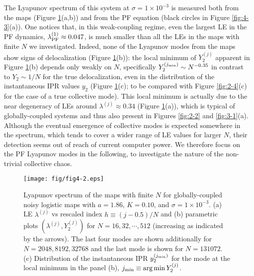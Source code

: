 \documentclass[12pt]{iopart}
\begin{document}
The Lyapunov spectrum of this system at $\sigma = 1 \times 10^{-3}$
 is measured both from the maps (Figure \ref{fig:4-2}(a,b))
 and from the PF equation (black circles in Figure \ref{fig:4-3}(a)).
One notices that, in this weak-coupling regime,
 even the largest LE in the PF dynamics,
 $\lambda_{\rm PF}^{(1)} \approx 0.047$, is much smaller
 than all the LEs in the maps with finite $N$ we investigated.
Indeed, none of the Lyapunov modes from the maps
 show signs of delocalization (Figure \ref{fig:4-2}(b)):
 the local minimum of $Y_2^{(j)}$ apparent in Figure \ref{fig:4-2}(b)
 depends only weakly on $N$, specifically $Y_2^{(j_{\rm min})} \sim N^{-0.35}$
 in contrast to $Y_2 \sim 1/N$ for the true delocalization,
 even in the distribution of the instantaneous IPR values $y_2$
 (Figure \ref{fig:4-2}(c); to be compared with Figure \ref{fig:2-4}(c)
 for the case of a true collective mode).
This local minimum is actually due to the near degeneracy of LEs
 around $\lambda^{(j)} \approx 0.34$ (Figure \ref{fig:4-2}(a)),
 which is typical of globally-coupled systems \cite{Takeuchi.etal-PRL2011}
 and thus also present in Figures \ref{fig:2-2} and \ref{fig:3-1}(a).
Although the eventual emergence of collective modes is expected
 somewhere in the spectrum,
 which tends to cover a wider range of LE values for larger $N$,
 their detection seems out of reach of current computer power.
We therefore focus on the PF Lyapunov modes in the following,
 to investigate the nature of the non-trivial collective chaos.

\begin{figure}[t]
  \texttt{[image: fig/fig4-2.eps]}
  \caption{Lyapunov spectrum of the maps with finite $N$ for globally-coupled noisy logistic maps  with $a=1.86$, $K=0.10$, and $\sigma = 1 \times 10^{-3}$. (a) LE $\lambda^{(j)}$ vs rescaled index $h \equiv (j-0.5)/N$ and (b) parametric plots $(\lambda^{(j)}, Y_2^{(j)})$ for $N = 16, 32, \cdots, 512$ (increasing as indicated by the arrows). The last four modes are shown additionally for $N = 2048, 8192, 32768$ and the last mode is shown for $N = 131072$. (c) Distribution of the instantaneous IPR $y_2^{(j_{\rm min})}$ for the mode at the local minimum in the panel (b), $j_{\rm min} \equiv \arg\min Y_2^{(j)}$.}
  \label{fig:4-2}
\end{figure}%
\end{document}
